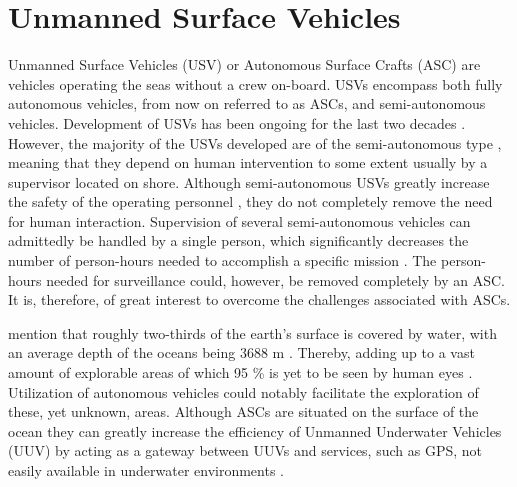 \chapter{Unmanned Surface Vehicles} %

\label{Unmanned_Surface_Vehicles} %

Unmanned Surface Vehicles (USV) or Autonomous Surface Crafts (ASC) are vehicles operating the seas without a crew on-board.
USVs encompass both fully autonomous vehicles, from now on referred to as ASCs, and semi-autonomous vehicles.
Development of USVs has been ongoing for the last two decades \cite{manley2008unmanned}.
However, the majority of the USVs developed are of the semi-autonomous type \cite{liu2016unmanned,park2017development}, meaning that they depend on human intervention to some extent usually by a supervisor located on shore.
Although semi-autonomous USVs greatly increase the safety of the operating personnel \cite{liu2016unmanned}, they do not completely remove the need for human interaction.
Supervision of several semi-autonomous vehicles can admittedly be handled by a single person, which significantly decreases the number of person-hours needed to accomplish a specific mission \cite{manley2008unmanned}.
The person-hours needed for surveillance could, however, be removed completely by an ASC.
It is, therefore, of great interest to overcome the challenges associated with ASCs.


\textcite{Yuh2011} mention that roughly two-thirds of the earth's surface is covered by water, with an average depth of the oceans being 3688 m \cite{depth_ocean}.
Thereby, adding up to a vast amount of explorable areas of which 95 \% is yet to be seen by human eyes \cite{explored_percentage}. Utilization of autonomous vehicles could notably facilitate the  exploration of these, yet unknown, areas.
Although ASCs are situated on the surface of the ocean they can greatly increase the efficiency of Unmanned Underwater Vehicles (UUV) by acting as a gateway between UUVs and services, such as GPS, not easily available in underwater environments \cite{liu2016unmanned}.

